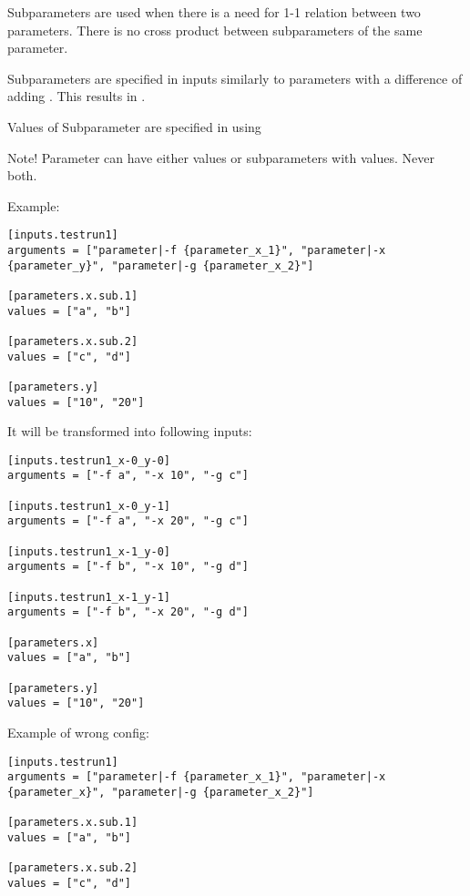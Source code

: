 \documentclass[a4paper,english]{article}
\begin{document}
\begin{adjustwidth}{18pt}{0pt}
        Subparameters are used when there is a need for 1-1 relation between two parameters.
        There is no cross product between subparameters of the same parameter.

        Subparameters are specified in inputs similarly to parameters with a difference of adding .
        This results in .

        Values of Subparameter are specified in  using 

        Note! Parameter can have either values or subparameters with values. Never both.

        Example:

        \begin{verbatim}
[inputs.testrun1]
arguments = ["parameter|-f {parameter_x_1}", "parameter|-x {parameter_y}", "parameter|-g {parameter_x_2}"]

[parameters.x.sub.1]
values = ["a", "b"]

[parameters.x.sub.2]
values = ["c", "d"]

[parameters.y]
values = ["10", "20"]
        \end{verbatim}

                It will be transformed into following inputs:

        \begin{verbatim}
[inputs.testrun1_x-0_y-0]
arguments = ["-f a", "-x 10", "-g c"]

[inputs.testrun1_x-0_y-1]
arguments = ["-f a", "-x 20", "-g c"]

[inputs.testrun1_x-1_y-0]
arguments = ["-f b", "-x 10", "-g d"]

[inputs.testrun1_x-1_y-1]
arguments = ["-f b", "-x 20", "-g d"]

[parameters.x]
values = ["a", "b"]

[parameters.y]
values = ["10", "20"]
        \end{verbatim}

        Example of wrong config:

        \begin{verbatim}
[inputs.testrun1]
arguments = ["parameter|-f {parameter_x_1}", "parameter|-x {parameter_x}", "parameter|-g {parameter_x_2}"]

[parameters.x.sub.1]
values = ["a", "b"]

[parameters.x.sub.2]
values = ["c", "d"]


\end{verbatim}
\end{adjustwidth}
\end{document}
